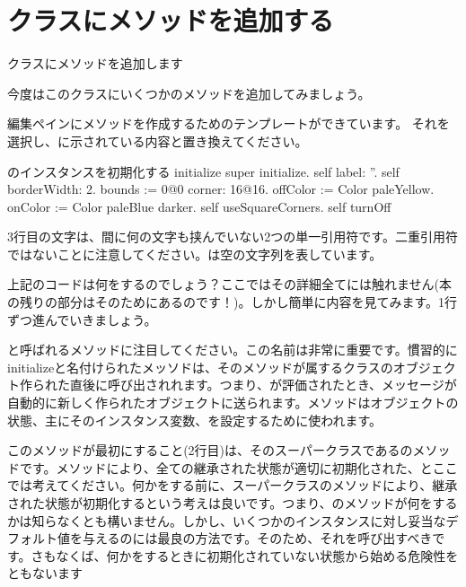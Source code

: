 \documentclass[a4paper,10pt,twoside]{book}
\begin{document}
\section{クラスにメソッドを追加する}

クラスにメソッドを追加します

今度はこのクラスにいくつかのメソッドを追加してみましょう。

編集ペインにメソッドを作成するためのテンプレートができています。
それを選択し、に示されている内容と置き換えてください。

\begin{numMethod}[scbecellinitialize]{のインスタンスを初期化する}
initialize
   super initialize.
   self label: ''.
   self borderWidth: 2.
   bounds := 0@0 corner: 16@16.
   offColor := Color paleYellow.
   onColor := Color paleBlue darker.
   self useSquareCorners.
   self turnOff
\end{numMethod}

\noindent
3行目の文字は、間に何の文字も挟んでいない2つの単一引用符です。二重引用符ではないことに注意してください。は空の文字列を表しています。


上記のコードは何をするのでしょう？ここではその詳細全てには触れません(本の残りの部分はそのためにあるのです！)。しかし簡単に内容を見てみます。1行ずつ進んでいきましょう。

と呼ばれるメソッドに注目してください。この名前は非常に重要です。慣習的にinitializeと名付けられたメッソドは、そのメソッドが属するクラスのオブジェクト作られた直後に呼び出されれます。つまり、が評価されたとき、メッセージが自動的に新しく作られたオブジェクトに送られます。メソッドはオブジェクトの状態、主にそのインスタンス変数、を設定するために使われます。

このメソッドが最初にすること(2行目)は、そのスーパークラスであるのメソッドです。メソッドにより、全ての継承された状態が適切に初期化された、とここでは考えてください。何かをする前に、スーパークラスのメソッドにより、継承された状態が初期化するという考えは良いです。つまり、のメソッドが何をするかは知らなくとも構いません。しかし、いくつかのインスタンスに対し妥当なデフォルト値を与えるのには最良の方法です。そのため、それを呼び出すべきです。さもなくば、何かをするときに初期化されていない状態から始める危険性をともないます
\end{document}
